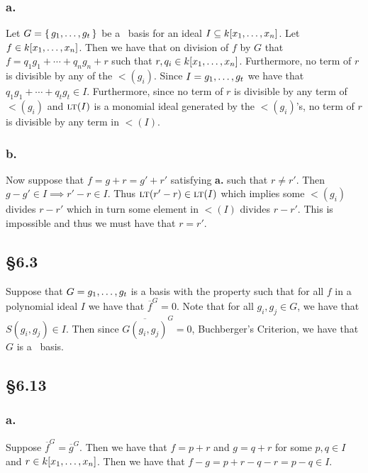 \documentclass[letterpaper]{article}
\begin{document}
\subsubsection*{a.}

Let $G = \set{g_{1}, \ldots, g_{t}}$ be a \Grobner\ basis for an ideal $I \subseteq k\bqty{x_{1}, \ldots, x_{n}}$. Let $f \in k\bqty{x_{1}, \ldots, x_{n}}$. Then we have that on division of $f$ by $G$ that $f = q_{1}g_{1} + \cdots + q_{n}g_{n} + r$ such that $r, q_{i} \in k\bqty{x_{1}, \ldots, x_{n}}$. Furthermore, no term of $r$ is divisible by any of the $\lt(g_{i})$. Since $I = \gen{g_{1}, \ldots, g_{t}}$ we have that $q_{1}g_{1} + \cdots + q_{t}g_{t} \in I$. Furthermore, since no term of $r$ is divisible by any term of $\lt(g_{i})$ and $\gen{\lt(I)}$ is a monomial ideal generated by the $\lt(g_{i})$'s, no term of $r$ is divisible by any term in $\lt(I)$.

\subsubsection*{b.}

Now suppose that $f = g + r = g' + r'$ satisfying \textbf{a.} such that $r \neq r'$. Then $g - g' \in I \implies r' - r \in I$. Thus $\lt(r' - r) \in \gen{\lt(I)}$ which implies some $\lt(g_{i})$ divides $r - r'$ which in turn some element in $\lt(I)$ divides $r - r'$. This is impossible and thus we must have that $r = r'$.

\subsection*{\S 6.3}

Suppose that $G = \gen{g_{1}, \ldots, g_{t}}$ is a basis with the property such that for all $f$ in a polynomial ideal $I$ we have that $\overline{f}^{G} = 0$. Note that for all $g_{i}, g_{j} \in G$, we have that $S(g_{i}, g_{j}) \in I$. Then since $\overline{G(g_{i}, g_{j})}^{G} = 0$, Buchberger's Criterion, we have that $G$ is a \Grobner\ basis.

\subsection*{\S 6.13}

\subsubsection*{a.}

Suppose $\overline{f}^{G} = \overline{g}^{G}$. Then we have that $f = p + r$ and $g = q + r$ for some $p, q \in I$ and $r \in k\bqty{x_{1}, \ldots, x_{n}}$. Then we have that $f - g = p + r - q - r = p - q \in I$.
\end{document}
